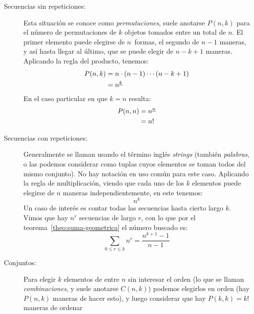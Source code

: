   \begin{description}
  \item[Secuencias sin repeticiones:]
    Esta situación se conoce como \emph{permutaciones},
    suele anotarse \(P(n, k)\) para el número de permutaciones
    de \(k\) objetos tomados entre un total de \(n\).
    El primer elemento puede elegirse de \(n\)~formas,
    el segundo de \(n - 1\) maneras,
    y así hasta llegar al último,
    que se puede elegir de \(n - k + 1\) maneras.
    Aplicando la regla del producto,
    tenemos:
    \begin{align}
      P(n, k)
	&= n \cdot (n - 1) \dotsm (n - k + 1) \notag \\
	&= n^{\underline{k}} \label{eq:Perm=ff}
    \end{align}
    En el caso particular en que \(k = n\) resulta:
    \begin{align}
      P(n, n)
	&= n^{\underline{n}} \notag \\
	&= n! \label{eq:Perms=n!}
    \end{align}
  \item[Secuencias con repeticiones:]
    Generalmente se llaman
    usando el término inglés
      \emph{\foreignlanguage{english}{strings}}%
    (también \emph{palabras},%
     o las podemos considerar como tuplas
     cuyos elementos se toman todos del mismo conjunto).
    No hay notación en uso común para este caso.
    Aplicando la regla de multiplicación,
    viendo que cada uno de los \(k\) elementos
    puede elegirse de \(n\) maneras independientemente,
    en este tenemos:
    \begin{equation*}
      n^k
    \end{equation*}
    Un caso de interés
    es contar todas las secuencias hasta cierto largo \(k\).
    Vimos que hay \(n^r\) secuencias de largo \(r\),
    con lo que por el teorema~\ref{theo:suma-geometrica}
    el número buscado es:
    \begin{equation*}
      \sum_{0 \le r \le k} n^r
	= \frac{n^{k + 1} - 1}{n - 1}
    \end{equation*}
  \item[Conjuntos:]
    Para elegir \(k\) elementos de entre \(n\)
    sin interesar el orden
    (lo que se llaman \emph{combinaciones},%
     y suele anotarse \(C(n, k)\))
    podemos elegirlos en orden
    (hay \(P(n, k)\) maneras de hacer esto),
    y luego considerar que hay \(P(k, k) = k!\) maneras de ordenar

\end{description}
